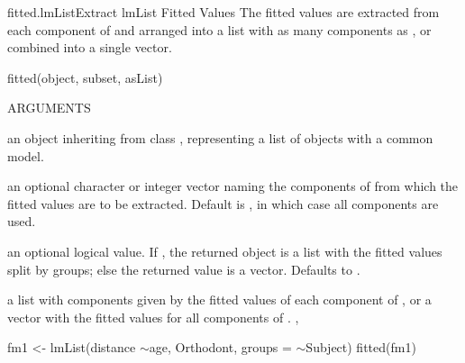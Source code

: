 \documentclass[pdftex]{article} \usepackage{url,graphicx}
\renewcommand{\Twiddle}{\mbox{\(\sim\)}}
\begin{document}
\begin{Helpfile}{fitted.lmList}{Extract lmList Fitted Values}
The fitted values are extracted from each  component of
 and arranged into a list with as many components as
, or combined into a single vector.
\begin{Example}
fitted(object, subset, asList)
\end{Example}
\begin{Argument}{ARGUMENTS}
\item[\Co{object:}]
an object inheriting from class , representing
a list of  objects with a common model.
\item[\Co{subset:}]
an optional character or integer vector naming the
 components of  from which the fitted values
are to be extracted. Default is , in which case all
components are used.
\item[\Co{asList:}]
an optional logical value. If , the returned
object is a list with the fitted values split by groups; else the
returned value is a vector. Defaults to .
\end{Argument}
a list with components given by the fitted values of each 
component of , or a vector with the fitted values for all
 components of .
, 
\need 15pt
\vspace{-16pt} 
\begin{Example}
fm1 <- lmList(distance \Twiddle age, Orthodont, groups = \Twiddle Subject)
fitted(fm1)
\end{Example}
\end{Helpfile}
\end{document}
